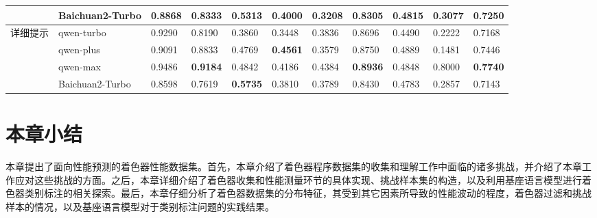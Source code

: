\begin{table}[]
{\begin{tabular}{llllllllll|l}
                               & Baichuan2-Turbo & 0.8868          & 0.8333          & 0.5313          & 0.4000          & 0.3208          & 0.8305          & 0.4815          & 0.3077          & 0.7250          \\
        \midrule
        \multirow{4}{*}{详细提示}  & qwen-turbo      & 0.9290          & 0.8190          & 0.3860          & 0.3448          & 0.3836          & 0.8696          & 0.4490          & 0.2222          & 0.7168          \\
                               & qwen-plus       & 0.9091          & 0.8833          & 0.4769          & \textbf{0.4561} & 0.3579          & 0.8750          & 0.4889          & 0.1481          & 0.7446          \\
                               & qwen-max        & 0.9486          & \textbf{0.9184} & 0.4842          & 0.4186          & 0.4384          & \textbf{0.8936} & 0.4848          & 0.8000          & \textbf{0.7740} \\
                               & Baichuan2-Turbo & 0.8598          & 0.7619          & \textbf{0.5735} & 0.3810          & 0.3789          & 0.8430          & 0.4783          & 0.2857          & 0.7143          \\
        \bottomrule
        \end{tabular}%
    }
\end{table}

\clearpage

\section{{\added 本章小结}}

{\added 本章提出了面向性能预测的着色器性能数据集。首先，本章介绍了着色器程序数据集的收集和理解工作中面临的诸多挑战，并介绍了本章工作应对这些挑战的方面。之后，本章详细介绍了着色器收集和性能测量环节的具体实现、挑战样本集的构造，以及利用基座语言模型进行着色器类别标注的相关探索。最后，本章仔细分析了着色器数据集的分布特征，其受到其它因素所导致的性能波动的程度，着色器过滤和挑战样本的情况，以及基座语言模型对于类别标注问题的实践结果。}